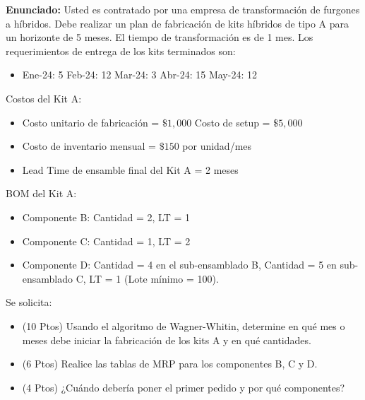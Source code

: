 \documentclass[11pt, a4paper]{article}
\begin{document}
  \textbf{Enunciado:}
  Usted es contratado por una empresa de transformación de furgones a híbridos. Debe realizar un plan de fabricación de kits híbridos de tipo A para un horizonte de 5 meses. El tiempo de transformación es de 1 mes. Los requerimientos de entrega de los kits terminados son:
  \begin{itemize}
    \item Ene-24: 5 \quad Feb-24: 12 \quad Mar-24: 3 \quad Abr-24: 15 \quad May-24: 12
  \end{itemize}

  Costos del Kit A:
  \begin{itemize}
    \item Costo unitario de fabricación = $\$1,000$ \quad Costo de setup = $\$5,000$
    \item Costo de inventario mensual = $\$150$ por unidad/mes
    \item Lead Time de ensamble final del Kit A = 2 meses
  \end{itemize}

  BOM del Kit A:
  \begin{itemize}
    \item Componente B: Cantidad = 2, LT = 1
    \item Componente C: Cantidad = 1, LT = 2
    \item Componente D: Cantidad = 4 en el sub-ensamblado B, Cantidad = 5 en sub-ensamblado C, LT = 1 (Lote mínimo = 100).
  \end{itemize}

  Se solicita:
  \begin{itemize}
    \item[\textbf{a)}] (10 Ptos) Usando el algoritmo de Wagner-Whitin, determine en qué mes o meses debe iniciar la fabricación de los kits A y en qué cantidades.
    \item[\textbf{b)}] (6 Ptos) Realice las tablas de MRP para los componentes B, C y D.
    \item[\textbf{c)}] (4 Ptos) ¿Cuándo debería poner el primer pedido y por qué componentes?
  \end{itemize}
\end{document}

